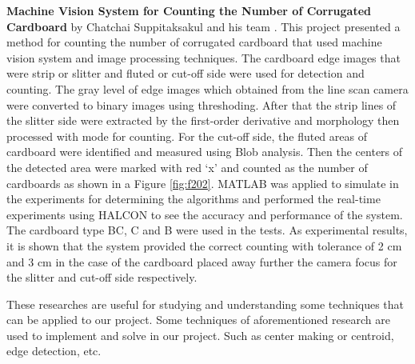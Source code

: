 \textbf{Machine Vision System for Counting the Number of Corrugated Cardboard}
by Chatchai Suppitaksakul and his team \cite{Machine}. This project presented a method for counting the number of corrugated cardboard that used machine vision system and image processing techniques. The cardboard edge images that were strip or slitter and fluted or cut-off side were used for detection and counting. The gray level of edge images which obtained from the line scan camera were converted to binary images using threshoding. After that the strip lines of the slitter side were extracted by the first-order derivative and morphology then processed with mode for counting. For the cut-off side, the fluted areas of cardboard were identified and measured using Blob analysis. Then the centers of the detected area were marked with red ‘x’ and counted as the number of cardboards as shown in a Figure \ref{fig:f202}. MATLAB was applied to simulate in the experiments for determining the algorithms and performed the real-time experiments using HALCON to see the accuracy and performance of the system. The cardboard type BC, C and B were used in the tests. As experimental results, it is shown that the system provided the correct counting with tolerance of 2 cm and 3 cm in the case of the cardboard placed away further the camera focus for the slitter and cut-off side respectively.


These researches are useful for studying and understanding some techniques that can be applied to our project. Some techniques of aforementioned research are used to implement and solve in our project. Such as center making or centroid, edge detection, etc. 
